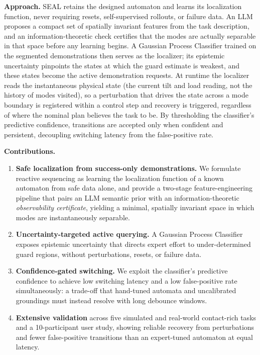 \textbf{Approach.} SEAL retains the designed automaton and learns its localization function, never requiring resets, self-supervised rollouts, or failure data. An LLM proposes a compact set of spatially invariant features from the task description, and an information-theoretic check certifies that the modes are actually separable in that space before any learning begins. A Gaussian Process Classifier trained on the segmented demonstrations then serves as the localizer; its epistemic uncertainty pinpoints the states at which the guard estimate is weakest, and these states become the active demonstration requests. At runtime the localizer reads the instantaneous physical state (the current tilt and load reading, not the history of modes visited), so a perturbation that drives the state across a mode boundary is registered within a control step and recovery is triggered, regardless of where the nominal plan believes the task to be. By thresholding the classifier's predictive confidence, transitions are accepted only when confident and persistent, decoupling switching latency from the false-positive rate.



\textbf{Contributions.}
\begin{enumerate}
\item \textbf{Safe localization from success-only demonstrations.} We formulate reactive sequencing as learning the localization function of a known automaton from safe data alone, and provide a two-stage feature-engineering pipeline that pairs an LLM semantic prior with an information-theoretic \emph{observability certificate}, yielding a minimal, spatially invariant space in which modes are instantaneously separable.
\item \textbf{Uncertainty-targeted active querying.} A Gaussian Process Classifier exposes epistemic uncertainty that directs expert effort to under-determined guard regions, without perturbations, resets, or failure data.
\item \textbf{Confidence-gated switching.} We exploit the classifier's predictive confidence to achieve low switching latency and a low false-positive rate simultaneously: a trade-off that hand-tuned automata and uncalibrated groundings must instead resolve with long debounce windows.
\item \textbf{Extensive validation} across five simulated and real-world contact-rich tasks and a 10-participant user study, showing reliable recovery from perturbations and fewer false-positive transitions than an expert-tuned automaton at equal latency.
\end{enumerate}


